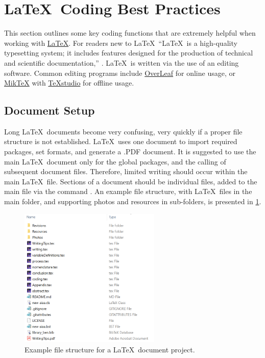 \section{\LaTeX~Coding Best Practices} \label{sec:Conclusion}
This section outlines some key coding functions that are extremely helpful when working with \href{https://www.latex-project.org/}{\LaTeX}. 
For readers new to \LaTeX\, ``LaTeX\ is a high-quality typesetting system; it includes features designed for the production of technical and scientific documentation,'' \cite{latexExplanation}. 
\LaTeX\ is written via the use of an editing software. 
Common editing programs include \href{https://www.overleaf.com/}{OverLeaf} for online usage, or \href{https://miktex.org/}{Mik\TeX} with \href{https://www.texstudio.org/}{\TeX studio} for offline usage. 

\subsection{Document Setup}
Long \LaTeX\ documents become very confusing, very quickly if a proper file structure is not established. 
\LaTeX\ uses one document to import required packages, set formats, and generate a .PDF document. 
It is suggested to use the main \LaTeX\ document only for the global packages, and the calling of subsequent document files. 
Therefore, limited writing should occur within the main \LaTeX\ file. 
Sections of a document should be individual files, added to the main file via the command \verb*||. 
An example file structure, with \LaTeX\ files in the main folder, and supporting photos and resources in sub-folders, is presented in \cref{fig:documentSetupExample}.


\begin{figure}[hbt!]
	\centering
	\captionsetup{width=0.6\textwidth}
	\includegraphics[width=0.6\textwidth]{Photos/Figures/projectStructure.png}
	\caption{Example file structure for a \LaTeX\ document project.}
	\label{fig:documentSetupExample}
	\hfill
\end{figure}

